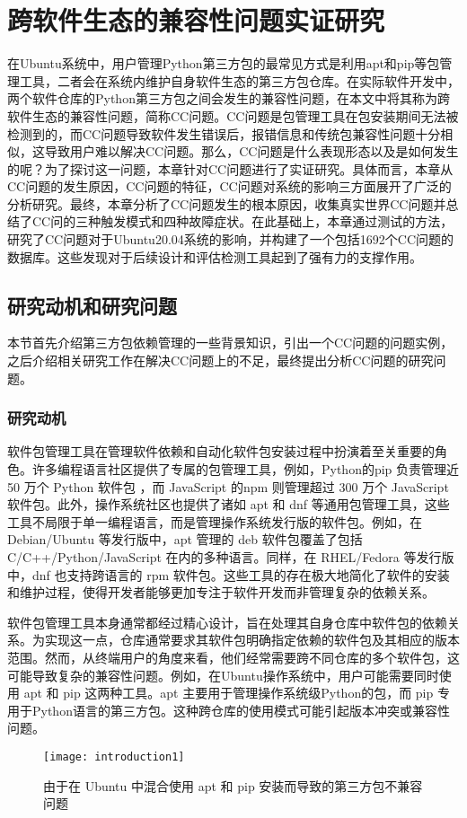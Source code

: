\chapter{跨软件生态的兼容性问题实证研究}
在Ubuntu系统中，用户管理Python第三方包的最常见方式是利用apt和pip等包管理工具，二者会在系统内维护自身软件生态的第三方包仓库。在实际软件开发中，两个软件仓库的Python第三方包之间会发生的兼容性问题，在本文中将其称为跨软件生态的兼容性问题，简称CC问题。CC问题是包管理工具在包安装期间无法被检测到的，而CC问题导致软件发生错误后，报错信息和传统包兼容性问题十分相似，这导致用户难以解决CC问题。那么，CC问题是什么表现形态以及是如何发生的呢？为了探讨这一问题，本章针对CC问题进行了实证研究。具体而言，本章从CC问题的发生原因，CC问题的特征，CC问题对系统的影响三方面展开了广泛的分析研究。最终，本章分析了CC问题发生的根本原因，收集真实世界CC问题并总结了CC问的三种触发模式和四种故障症状。在此基础上，本章通过测试的方法，研究了CC问题对于Ubuntu20.04系统的影响，并构建了一个包括1692个CC问题的数据库。这些发现对于后续设计和评估检测工具起到了强有力的支撑作用。

\section{研究动机和研究问题}
本节首先介绍第三方包依赖管理的一些背景知识，引出一个CC问题的问题实例，之后介绍相关研究工作在解决CC问题上的不足，最终提出分析CC问题的研究问题。
\subsection{研究动机}
软件包管理工具在管理软件依赖和自动化软件包安装过程中扮演着至关重要的角色。许多编程语言社区提供了专属的包管理工具，例如，Python的pip 负责管理近 50 万个 Python 软件包 ，而 JavaScript 的npm 则管理超过 300 万个 JavaScript 软件包。此外，操作系统社区也提供了诸如 apt 和 dnf 等通用包管理工具，这些工具不局限于单一编程语言，而是管理操作系统发行版的软件包。例如，在 Debian/Ubuntu 等发行版中，apt 管理的 deb 软件包覆盖了包括 C/C++/Python/JavaScript 在内的多种语言。同样，在 RHEL/Fedora 等发行版中，dnf 也支持跨语言的 rpm 软件包。这些工具的存在极大地简化了软件的安装和维护过程，使得开发者能够更加专注于软件开发而非管理复杂的依赖关系。

软件包管理工具本身通常都经过精心设计，旨在处理其自身仓库中软件包的依赖关系。为实现这一点，仓库通常要求其软件包明确指定依赖的软件包及其相应的版本范围。然而，从终端用户的角度来看，他们经常需要跨不同仓库的多个软件包，这可能导致复杂的兼容性问题。例如，在Ubuntu操作系统中，用户可能需要同时使用 apt 和 pip 这两种工具。apt 主要用于管理操作系统级Python的包，而 pip 专用于Python语言的第三方包。这种跨仓库的使用模式可能引起版本冲突或兼容性问题。
\begin{figure}[t] %
	\centering
	\texttt{[image: introduction1]}
	\caption{由于在 Ubuntu 中混合使用 apt 和 pip 安装而导致的第三方包不兼容问题}
	\label{fig:example}
\end{figure}

